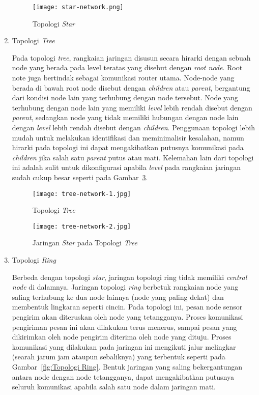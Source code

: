 \begin{enumerate}
    \begin{figure}[H]
    	\centering  
    	\texttt{[image: star-network.png]}  
    	\caption[Topologi \textit{Star}]{Topologi \textit{Star}}
    	\label{fig:Topologi Star} 
    \end{figure}
    
    \item Topologi \textit{Tree}
    
    Pada topologi \textit{tree}, rangkaian jaringan disusun secara hirarki dengan sebuah node yang berada pada level teratas yang disebut dengan \textit{root node}. Root note juga bertindak sebagai komunikasi router utama. Node-node yang berada di bawah root node disebut dengan \textit{children} atau \textit{parent}, bergantung dari kondisi node lain yang terhubung dengan node tersebut. Node yang terhubung dengan node lain yang memiliki \textit{level} lebih rendah disebut dengan \textit{parent}, sedangkan node yang tidak memiliki hubungan dengan node lain dengan \textit{level} lebih rendah disebut dengan \textit{children}. Penggunaan topologi lebih mudah untuk melakukan identifikasi dan meminimalisir kesalahan, namun hirarki pada topologi ini dapat mengakibatkan putusnya komunikasi pada \textit{children} jika salah satu \textit{parent} putus atau mati. Kelemahan lain dari topologi ini adalah sulit untuk dikonfigurasi apabila \textit{level} pada rangkaian jaringan sudah cukup besar seperti pada Gambar~\ref{fig:Jaringan Star pada Topologi Tree}.
    
    \begin{figure}[H]
    	\centering  
    	\texttt{[image: tree-network-1.jpg]}  
    	\caption[\textit{Topologi \textit{Tree}}]{Topologi \textit{Tree}}
    	\label{fig:Topologi Tree} 
    \end{figure}
    
    \begin{figure}[H]
    	\centering  
    	\texttt{[image: tree-network-2.jpg]}  
    	\caption[Jaringan \textit{Star} pada Topologi \textit{Tree}]{Jaringan \textit{Star} pada Topologi \textit{Tree}}
    	\label{fig:Jaringan Star pada Topologi Tree} 
    \end{figure}
    
    
    \item Topologi \textit{Ring}
    
    Berbeda dengan topologi \textit{star}, jaringan topologi ring tidak memiliki \textit{central node} di dalamnya. Jaringan topologi \textit{ring} berbetuk rangkaian node yang saling terhubung ke dua node lainnya (node yang paling dekat) dan membentuk lingkaran seperti cincin. Pada topologi ini, pesan node sensor pengirim akan diteruskan oleh node yang tetangganya. Proses komunikasi pengiriman pesan ini akan dilakukan terus menerus, sampai pesan yang dikirimkan oleh node pengirim diterima oleh node yang dituju. Proses komunikasi yang dilakukan pada jaringan ini mengikuti jalur melingkar (searah jarum jam ataupun sebaliknya) yang terbentuk seperti pada Gambar~\ref{fig:Topologi Ring}. Bentuk jaringan yang saling bekergantungan antara node dengan node tetangganya, dapat mengakibatkan putusnya seluruh komunikasi apabila salah satu node dalam jaringan mati.
    

\end{enumerate}
